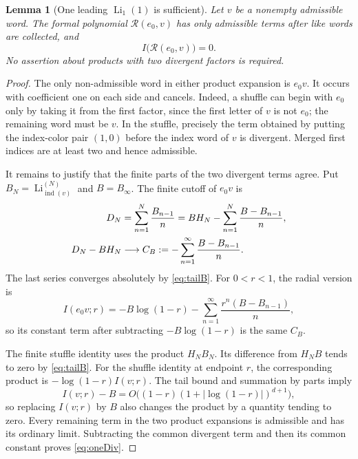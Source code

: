 \documentclass[11pt,letterpaper]{article}
\numberwithin{equation}{section}
\newtheorem{lemma}[theorem]{Lemma}
\theoremstyle{definition}
\DeclareMathOperator{\Li}{Li}
\newcommand{\ind}{\operatorname{ind}}
\begin{document}
\begin{lemma}[One leading $\Li_1(1)$ is sufficient]\label{lem:oneDiv}
Let $v$ be a nonempty admissible word. The formal polynomial
$\mathcal R(e_0,v)$ has only admissible terms after like words are
collected, and
\begin{equation}
 I\bigl(\mathcal R(e_0,v)\bigr)=0.
 \label{eq:oneDiv}
\end{equation}
No assertion about products with two divergent factors is required.
\end{lemma}
\begin{proof}
The only non-admissible word in either product expansion is $e_0v$.
It occurs with coefficient one on each side and cancels. Indeed, a
shuffle can begin with $e_0$ only by taking it from the first factor,
since the first letter of $v$ is not $e_0$; the remaining word must be
$v$. In the stuffle, precisely the term obtained by putting the
index-color pair $(1,0)$ before the index word of $v$ is divergent.
Merged first indices are at least two and hence admissible.

It remains to justify that the finite parts of the two divergent terms
agree. Put $B_N=\Li_{\ind(v)}^{(N)}$ and $B=B_\infty$. The finite cutoff
of $e_0v$ is
\begin{align}
 D_N&=\sum_{n=1}^N\frac{B_{n-1}}n
 =BH_N-\sum_{n=1}^N\frac{B-B_{n-1}}n,\notag\\
 D_N-BH_N&\longrightarrow
 C_B:=-\sum_{n=1}^{\infty}\frac{B-B_{n-1}}n.
 \label{eq:cutoffconstant}
\end{align}
The last series converges absolutely by \eqref{eq:tailB}. For $0<r<1$,
the radial version is
\begin{equation}
 I(e_0v;r)=-B\log(1-r)
 -\sum_{n=1}^{\infty}\frac{r^n(B-B_{n-1})}{n},
 \label{eq:Abelconstant}
\end{equation}
so its constant term after subtracting $-B\log(1-r)$ is the same $C_B$.

The finite stuffle identity uses the product $H_NB_N$.
Its difference from $H_NB$ tends to zero by \eqref{eq:tailB}.
For the shuffle identity at endpoint $r$, the corresponding product is
$-\log(1-r)I(v;r)$. The tail bound and summation by parts imply
\[
 I(v;r)-B=O\bigl((1-r)(1+|\log(1-r)|)^{d+1}\bigr),
\]
so replacing $I(v;r)$ by $B$ also changes the product by a quantity
tending to zero. Every remaining term in the two product expansions is
admissible and has its ordinary limit. Subtracting the common divergent
term and then its common constant proves \eqref{eq:oneDiv}.
\end{proof}
\end{document}
